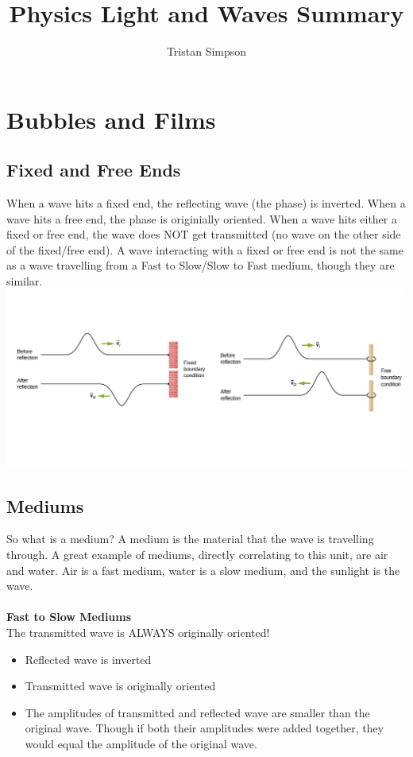 \documentclass{article}
\title{Physics Light and Waves Summary}
\author{Tristan Simpson}
\begin{document}
\maketitle
\tableofcontents

\vspace{3cm}
\section{Bubbles and Films}
\subsection{Fixed and Free Ends}
When a wave hits a fixed end, the reflecting wave (the phase) is inverted. When a wave hits a free end, the phase is originially oriented. When a wave hits either a fixed or free end, the wave does NOT get transmitted (no wave on the other side of the fixed/free end).
A wave interacting with a fixed or free end is not the same as a wave travelling from a Fast to Slow/Slow to Fast medium, though they are similar.\\
\includegraphics[scale=3]{images/fixed_free_ends}

\vspace{-2cm}

\subsection{Mediums}\label{sec:mediums}
So what is a medium? A medium is the material that the wave is travelling through. A great example of mediums, directly correlating to this unit, are air and water. Air is a fast medium, water is a slow medium, and the sunlight is the wave.\\\\
\textbf{Fast to Slow Mediums}\\
The transmitted wave is ALWAYS originally oriented!
\begin{itemize}
    \item Reflected wave is inverted
    \item Transmitted wave is originally oriented
    \item The amplitudes of transmitted and reflected wave are smaller than the original wave. Though if both their amplitudes were added together, they would equal the amplitude of the original wave.
\end{itemize}\leavevmode
\end{document}
